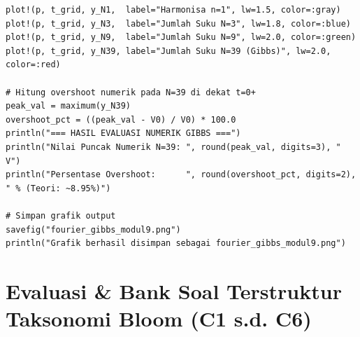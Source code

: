 \documentclass[11pt,a4paper]{article}
\theoremstyle{definition}
\begin{document}
\begin{lstlisting}[style=juliastyle, caption={Skrip Julia sintesis Deret Fourier dan demonstrasi Fenomena Gibbs.}, label={lst:julia_fourier_gibbs}]
plot!(p, t_grid, y_N1,  label="Harmonisa n=1", lw=1.5, color=:gray)
plot!(p, t_grid, y_N3,  label="Jumlah Suku N=3", lw=1.8, color=:blue)
plot!(p, t_grid, y_N9,  label="Jumlah Suku N=9", lw=2.0, color=:green)
plot!(p, t_grid, y_N39, label="Jumlah Suku N=39 (Gibbs)", lw=2.0, color=:red)

# Hitung overshoot numerik pada N=39 di dekat t=0+
peak_val = maximum(y_N39)
overshoot_pct = ((peak_val - V0) / V0) * 100.0
println("=== HASIL EVALUASI NUMERIK GIBBS ===")
println("Nilai Puncak Numerik N=39: ", round(peak_val, digits=3), " V")
println("Persentase Overshoot:      ", round(overshoot_pct, digits=2), " % (Teori: ~8.95%)")

# Simpan grafik output
savefig("fourier_gibbs_modul9.png")
println("Grafik berhasil disimpan sebagai fourier_gibbs_modul9.png")
\end{lstlisting}

\section{Evaluasi \& Bank Soal Terstruktur Taksonomi Bloom (C1 s.d. C6)}
\end{document}
